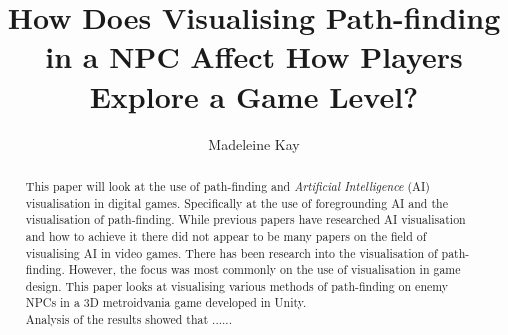 \documentclass[journal]{IEEEtran}
\begin{document}
%
\title{ How Does Visualising Path-finding in a NPC Affect How Players Explore a Game Level?}
%
%
\author{Madeleine Kay}


\maketitle

\begin{abstract}
	This paper will look at the use of path-finding and \textit{Artificial Intelligence} (AI) visualisation in digital games.   Specifically at the use of foregrounding AI and the visualisation of path-finding. 
While previous papers have researched AI visualisation and how to achieve it there did not appear to be many papers on the field of visualising AI in video games. There has been research into the visualisation of path-finding. However, the focus was most commonly on the use of visualisation in game design. 
	This paper looks at visualising various methods of path-finding on enemy NPCs in a 3D metroidvania game developed in Unity.\\
 Analysis of the results showed that ......\\

\end{abstract}
\end{document}
